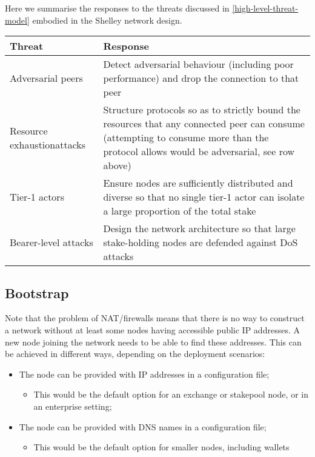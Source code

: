 \documentclass[11pt,a4paper]{article}
\begin{document}
Here we summarise the responses to the threats discussed in
\cref{high-level-threat-model} embodied in the
Shelley network design.

\begin{longtable}[]{p{4cm}p{10cm}}
\toprule
\textbf{Threat} & \textbf{Response}\tabularnewline
\midrule
\endhead
Adversarial peers & Detect adversarial behaviour (including poor
performance) and drop the connection to that peer\tabularnewline
Resource exhaustion\newline attacks & Structure protocols so as to strictly
bound the resources that any connected peer can consume (attempting to
consume more than the protocol allows would be adversarial, see row
above)\tabularnewline
Tier-1 actors & Ensure nodes are sufficiently distributed and diverse so
that no single tier-1 actor can isolate a large proportion of the total
stake\tabularnewline
Bearer-level attacks & Design the network architecture so that large
stake-holding nodes are defended against DoS attacks\tabularnewline
\bottomrule
\end{longtable}

\subsection{Bootstrap}
\label{bootstrap}

Note that the problem of NAT/firewalls means that there is no way to
construct a network without at least some nodes having accessible public
IP addresses. A new node joining the network needs to be able to find
these addresses. This can be achieved in different ways, depending on
the deployment scenarios:

\begin{itemize}
\item
  The node can be provided with IP addresses in a configuration file;

  \begin{itemize}
  \item
    This would be the default option for an exchange or stakepool node,
    or in an enterprise setting;
  \end{itemize}
\item
  The node can be provided with DNS names in a configuration file;

  \begin{itemize}
  \item
    This would be the default option for smaller nodes, including
    wallets
  \end{itemize}
\end{itemize}
\end{document}
